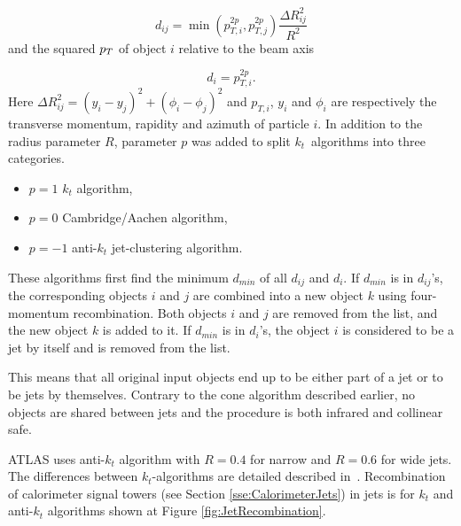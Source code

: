 \begin{equation}
	d_{ij} = \min{\left( p_{T,i}^{2p} , p_{T,j}^{2p} \right)} \frac{\Delta R_{ij}^2}{R^2}
\end{equation}
and the squared $p_{T}$ of object $i$ relative to the beam axis

\begin{equation}
	d_i = p_{T,i}^{2p}.
\end{equation}
Here $\Delta R_{ij}^2 = (y_i - y_j)^2 + (\phi_i - \phi_j)^2$ and $p_{T,i}$,
$y_i$ and $\phi_i$ are respectively the transverse momentum, rapidity and
azimuth of particle $i$. In addition to the radius parameter $R$, parameter $p$
was added to split $k_t$~algorithms into three categories.  
\begin{itemize}
	\item $p = 1$ $k_t$ algorithm,
	\item $p = 0$ Cambridge/Aachen algorithm,
	\item $p = -1$ anti-$k_t$ jet-clustering algorithm.
\end{itemize}

These algorithms first find the minimum $d_{min}$ of all $d_{ij}$ and $d_i$. If
$d_{min}$ is in $d_{ij}$'s, the corresponding objects $i$ and $j$ are combined
into a new object $k$ using four-momentum recombination. Both objects $i$ and
$j$ are removed from the list, and the new object $k$ is added to it. If
$d_{min}$ is in $d_i$'s, the object $i$ is considered to be a jet by itself and
is removed from the list.

This means that all original input objects end up to be either part of a jet or
to be jets by themselves. Contrary to the cone algorithm described earlier, no
objects are shared between jets and the procedure is both infrared and collinear
safe.

ATLAS uses anti-$k_t$ algorithm with $R=0.4$ for narrow and $R=0.6$ for wide
jets. The differences between $k_t$-algorithms are detailed described
in~\cite{ANTIKT}. Recombination of calorimeter signal towers (see Section
\ref{sse:CalorimeterJets}) in jets is for $k_t$ and anti-$k_t$ algorithms shown
at Figure \ref{fig:JetRecombination}.

